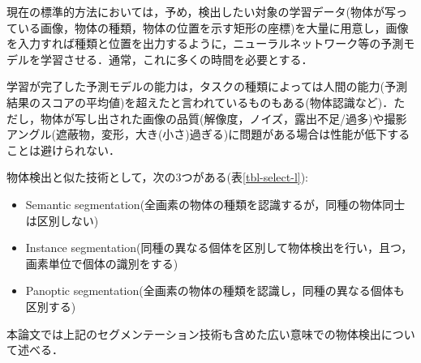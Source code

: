 \documentclass[twocolumn]{jsarticle} %
\begin{document}
現在の標準的方法においては，予め，検出したい対象の学習データ(物体が写っている画像，物体の種類，物体の位置を示す矩形の座標)を大量に用意し，画像を入力すれば種類と位置を出力するように，ニューラルネットワーク等の予測モデルを学習させる．通常，これに多くの時間を必要とする．

学習が完了した予測モデルの能力は，タスクの種類によっては人間の能力(予測結果のスコアの平均値)を超えたと言われているものもある(物体認識など)．ただし，物体が写し出された画像の品質(解像度，ノイズ，露出不足/過多)や撮影アングル(遮蔽物，変形，大き(小さ)過ぎる)に問題がある場合は性能が低下することは避けられない．

物体検出と似た技術として，次の3つがある(表\ref{tbl-select-l}):

\begin{itemize}
    \item Semantic segmentation(全画素の物体の種類を認識するが，同種の物体同士は区別しない)
    \item Instance segmentation(同種の異なる個体を区別して物体検出を行い，且つ，画素単位で個体の識別をする)
    \item Panoptic segmentation(全画素の物体の種類を認識し，同種の異なる個体も区別する)
\end{itemize}
本論文では上記のセグメンテーション技術も含めた広い意味での物体検出について述べる．
\end{document}
